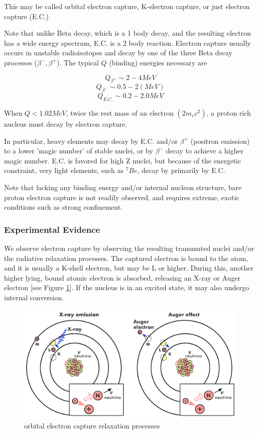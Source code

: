 \documentclass[%
 aip,
 jmp,%
 amsmath,amssymb,
 reprint,%
]{revtex4-1}
\begin{document}
This may be called orbital electron capture, K-electron capture, or just electron capture (E.C.) 

Note that unlike Beta decay, which is a 1 body decay, and the resulting electron has a wide energy spectrum, E.C. is a 2 body reaction. Electron capture usually occurs in unstable radioisotopes and decay by one of the three Beta decay processes ($\beta^{-}, \beta^{+}$). The typical $Q$ (binding) energies necessary are 

$$Q_{\beta^{+}}\sim2-4{MeV}$$
$$Q_{\beta^{-}}\sim0.5-2(MeV)$$
$$Q_{E.C.}\sim0.2-2.0{MeV}$$

When $Q<1.02{MeV}$, twice the rest mass of an electron $(2m_{e}c^{2})$, a proton rich nucleus must decay by electron capture.

In particular, heavy elements may decay by E.C. and/or $\beta^{+}$ (positron emission) to a lower 'magic number' of stable nuclei, or by $\beta^{-}$ decay to achieve a higher magic number. E.C. is favored for high Z nuclei, but because of the energetic constraint, very light elements, such as $^{7}Be$, decay by primarily by E.C.    

Note that lacking any binding energy and/or internal nucleon structure, bare proton electron capture is not readily observed, and requires extreme, exotic conditions such as strong confinement.

\subsubsection{Experimental Evidence}

We observe electron capture by observing the resulting transmuted nuclei and/or the radiative relaxation processes.  The captured electron is bound to the atom, and it is usually a K-shell electron, but may be L or higher.  During this, another higher lying, bound atomic electron is absorbed, releasing an X-ray or Auger electron [see Figure \ref{fig:ec1}].  If the nucleus is in an excited state, it may also  undergo internal conversion.  

\begin{figure}
   \includegraphics[scale=0.04]{img/EC-img.png}
   \caption{orbital electron capture relaxation processes}
  \label{fig:ec1}
\end{figure}
\end{document}
